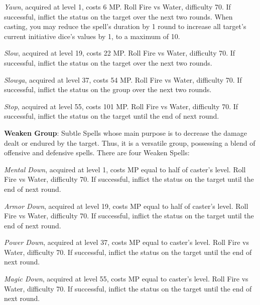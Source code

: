 \begin{multicols}{2}
    \textit{Yawn}, acquired at level 1, costs 6 MP\@. Roll Fire vs Water, difficulty 70. If successful, inflict the  status on the target over the next two rounds. When casting, you may reduce the spell's duration by 1 round to increase all target's current initiative dice's values by 1, to a maximum of 10.
    
    \textit{Slow}, acquired at level 19, costs 22 MP\@. Roll Fire vs Water, difficulty 70. If successful, inflict the  status on the target over the next two rounds.
    
    \textit{Slowga}, acquired at level 37, costs 54 MP\@. Roll Fire vs Water, difficulty 70. If successful, inflict the  status on the group over the next two rounds.
    
    \textit{Stop}, acquired at level 55, costs 101 MP\@. Roll Fire vs Water, difficulty 70. If successful, inflict the  status on the target until the end of next round.
    
    \ffcrystal[type=level,height=8pt]

    \textbf{Weaken Group}: Subtle Spells whose main purpose is to decrease the damage dealt or endured by the target. Thus, it is a versatile group, possessing a blend of offensive and defensive spells. There are four Weaken Spells:
    
    \textit{Mental Down}, acquired at level 1, costs MP equal to half of caster's level. Roll Fire vs Water, difficulty 70. If successful, inflict the  status on the target until the end of next round.
    
    \textit{Armor Down}, acquired at level 19, costs MP equal to half of caster's level. Roll Fire vs Water, difficulty 70. If successful, inflict the  status on the target until the end of next round.
    
    \textit{Power Down}, acquired at level 37, costs MP equal to caster's level. Roll Fire vs Water, difficulty 70. If successful, inflict the  status on the target until the end of next round.
    
    \textit{Magic Down}, acquired at level 55, costs MP equal to caster's level. Roll Fire vs Water, difficulty 70. If successful, inflict the  status on the target until the end of next round.
 

\end{multicols}
